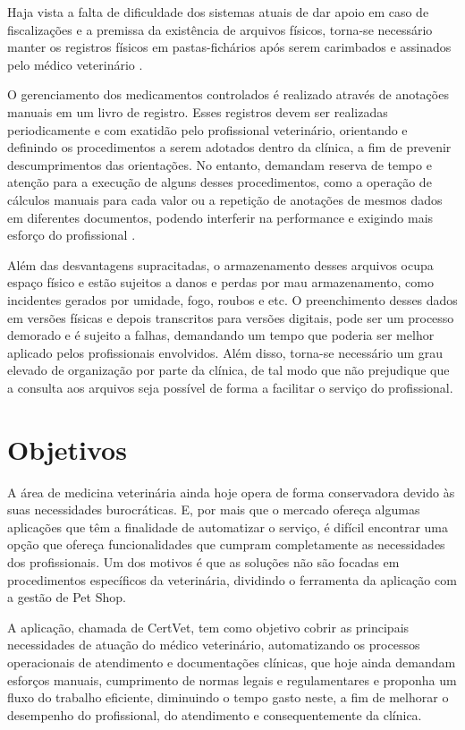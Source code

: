 \documentclass[
    12pt,               %
    openright,          %
    oneside,
    a4paper,            %
    MODELO,             %
    TODO,               %
    english,            %
    brazil              %
    ]{ifsp-spo-inf-ctds}
\begin{document}
    Haja vista a falta de dificuldade dos sistemas atuais de dar apoio em caso de fiscalizações e a premissa da existência de arquivos físicos, torna-se necessário manter os registros físicos em pastas-fichários após serem carimbados e assinados pelo médico veterinário \cite{pe_dig}.
    
    O gerenciamento dos medicamentos controlados é realizado através de anotações manuais em um livro de registro. Esses registros devem ser realizadas periodicamente e com exatidão pelo profissional veterinário, orientando e definindo os procedimentos a serem adotados dentro da clínica, a fim de prevenir descumprimentos das orientações. No entanto, demandam reserva de tempo e atenção para a execução de alguns desses procedimentos, como a operação de cálculos manuais para cada valor ou a repetição de anotações de mesmos dados em diferentes documentos, podendo interferir na performance e exigindo mais esforço do profissional \cite{normativa}.
    
    Além das desvantagens supracitadas, o armazenamento desses arquivos ocupa espaço físico e estão sujeitos a danos e perdas por mau armazenamento, como incidentes gerados por umidade, fogo, roubos e etc. O preenchimento desses dados em versões físicas e depois transcritos para versões digitais, pode ser um processo demorado e é sujeito a falhas, demandando um tempo que poderia ser melhor aplicado pelos profissionais envolvidos. Além disso, torna-se necessário um grau elevado de organização por parte da clínica, de tal modo que não prejudique que a consulta aos arquivos seja possível de forma a facilitar o serviço do profissional\cite{pe_dig}.

    \section{Objetivos}

    A área de medicina veterinária ainda hoje opera de forma conservadora devido às suas necessidades burocráticas. E, por mais que o mercado ofereça algumas aplicações que têm a finalidade de automatizar o serviço, é difícil encontrar uma opção que ofereça funcionalidades que cumpram completamente as necessidades dos profissionais. Um dos motivos é que as soluções não são focadas em procedimentos específicos da veterinária, dividindo o ferramenta da aplicação com a gestão de Pet Shop.
    
    A aplicação, chamada de CertVet, tem como objetivo cobrir as principais necessidades de atuação do médico veterinário, automatizando os processos operacionais de atendimento e documentações clínicas, que hoje ainda demandam esforços manuais, cumprimento de normas legais e regulamentares e proponha um fluxo do trabalho eficiente, diminuindo o tempo gasto neste, a fim de melhorar o desempenho do profissional, do atendimento e consequentemente da clínica.
\end{document}
